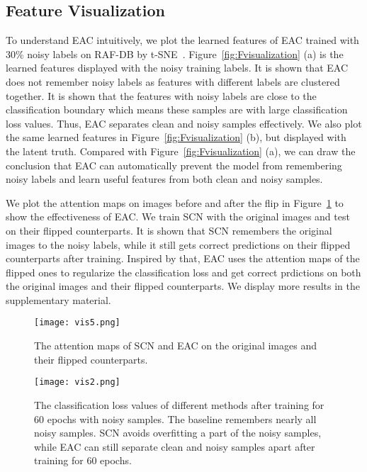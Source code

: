 \documentclass[runningheads]{llncs}
\begin{document}
\subsection{Feature Visualization}
\label{vis}
To understand EAC intuitively, we plot the learned features of EAC trained with 30\% noisy labels on RAF-DB by t-SNE~\cite{van2008visualizing}. Figure~\ref{fig:Fvisualization} (a) is the learned features displayed with the noisy training labels. It is shown that EAC does not remember noisy labels as features with different labels are clustered together. It is shown that the features with noisy labels are close to the classification boundary which means these samples are with large classification loss values. Thus, EAC separates clean and noisy samples effectively. We also plot the same learned features in Figure~\ref{fig:Fvisualization} (b), but displayed with the latent truth. Compared with Figure~\ref{fig:Fvisualization} (a), we can draw the conclusion that EAC can automatically prevent the model from remembering noisy labels and learn useful features from both clean and noisy samples.



We plot the attention maps on images before and after the flip in Figure~\ref{fig:values2} to show the effectiveness of EAC. We train SCN with the original images and test on their flipped counterparts. It is shown that SCN remembers the original images to the noisy labels, while it still gets correct predictions on their flipped counterparts after training. Inspired by that, EAC uses the attention maps of the flipped ones to regularize the classification loss and get correct prdictions on both the original images and their flipped counterparts. We display more results in the supplementary material.

\begin{figure}[!t]
\centering
\texttt{[image: vis5.png]}
\caption{The attention maps of SCN and EAC on the original images and their flipped counterparts.}
\label{fig:values2}
\end{figure}

\begin{figure}[!b]
\centering
\texttt{[image: vis2.png]}
\caption{The classification loss values of different methods after training for 60 epochs with noisy samples. The baseline remembers nearly all noisy samples. SCN avoids overfitting a part of the noisy samples, while EAC can still separate clean and noisy samples apart after training for 60 epochs.}
\label{fig:values}
\end{figure}
\end{document}
